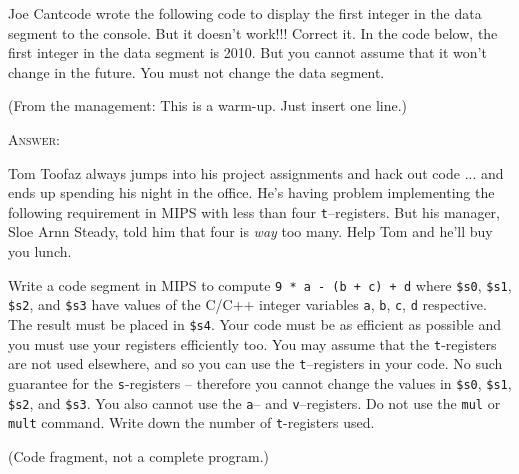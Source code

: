 \newpage
\nextq
Joe Cantcode wrote the following code to display the first
integer in the data segment 
to the
console.
But it doesn't work!!! Correct it.
In the code below, the first integer in the data segment is 2010.
But you cannot assume that it won't change in the future.
You must not change the data segment.

(From the management: This is a warm-up. Just insert one line.)

\textsc{Answer:}

\newpage
\nextq
Tom Toofaz always jumps into his project assignments and hack out code ... and
ends up spending his night in the office.
He's having problem implementing the following requirement
in MIPS with less than four \verb!t!--registers.
But his manager, Sloe Arnn Steady, told him that four is \textit{way} too many.
Help Tom and he'll buy you lunch.

Write a code segment in MIPS to compute
\verb!9 * a - (b + c) + d! where
\verb!$s0!, \verb!$s1!, \verb!$s2!, and
\verb!$s3! have values of the C/C++ integer variables
\verb!a!, \verb!b!, \verb!c!, \verb!d! respective.
The result must be placed in \verb!$s4!.
Your code must be as efficient as possible and you must use your registers
efficiently too.
You may assume that the \verb!t!-registers are not used elsewhere, and so you
can use the \verb!t!--registers in your code.
No such guarantee for the \verb!s!-registers -- therefore
you cannot change the values in
\verb!$s0!, \verb!$s1!, \verb!$s2!, and \verb!$s3!.
You also cannot use the \verb!a!-- and \verb!v!--registers.
Do not use the \verb!mul! or \verb!mult! command.
Write down the number of \verb!t!-registers used.
\\
\ANSWER
{}
\vspace{-4mm}
(Code fragment, not a complete program.)

